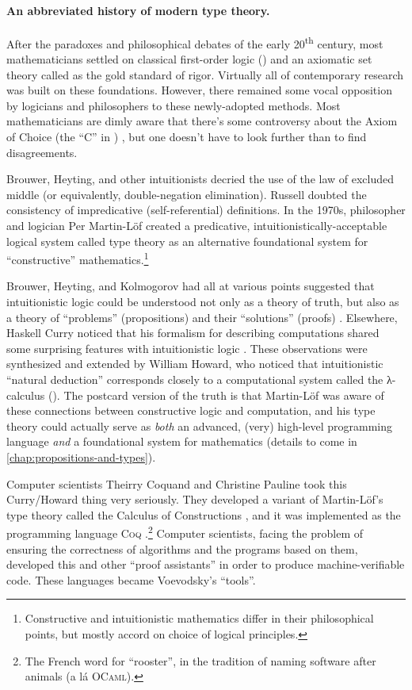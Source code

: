 \documentclass[12pt,twoside]{reedthesis}
\let\oldindex\index
\renewcommand{\index}[1]
               {\oldindex{#1}\marginpar{\footnotesize\color{index}index: #1}}
\newcommand{\indeX}{\oldindex}
\newcommand{\indeX}{\index}
\newcommand{\software}[1]{{\textsc{#1}}\indeX{#1}}
\newcommand{\Coq}{\software{Coq}}
\begin{document}
\paragraph{An abbreviated history of modern type theory.} After the paradoxes
and philosophical debates of the early 20\textsuperscript{th} century, most
mathematicians settled on classical first-order logic (\FOL{}) and an axiomatic
set theory called \ZFC{} as the gold standard of rigor. Virtually all of
contemporary research was built on these foundations. However, there remained
some vocal opposition by logicians and philosophers to these newly-adopted
methods. Most mathematicians are dimly aware that there's some controversy about
the Axiom of Choice (the ``C'' in \ZFC{}) \cite{martin-lof-100-years}, but one
doesn't have to look further than \FOL{} to find disagreements.

Brouwer, Heyting, and other intuitionists decried the use of the law
of excluded middle (or equivalently, double-negation elimination). Russell
doubted the consistency of impredicative (self-referential) definitions.
In the 1970s, philosopher and logician Per Martin-Löf created a predicative,
intuitionistically-acceptable logical system called type theory as an
alternative foundational system for ``constructive''
mathematics.\footnote{Constructive and intuitionistic mathematics differ in
their philosophical points, but mostly accord on choice of logical principles.}

Brouwer, Heyting, and Kolmogorov had all at various points suggested that
intuitionistic logic could be understood not only as a theory of truth, but also
as a theory of ``problems'' (propositions) and their ``solutions'' (proofs)
\cite{kolmogorov}. Elsewhere, Haskell Curry noticed that his formalism for
describing computations shared some surprising features with intuitionistic
logic \cite{curry-howard}. These observations were synthesized and extended by
William Howard, who noticed that intuitionistic ``natural deduction''
corresponds closely to a computational system called the λ-calculus (\LC{}).
The postcard version of the truth is that Martin-Löf was aware of these
connections between constructive logic and computation, and his type theory
could actually serve as \textit{both} an advanced, (very) high-level programming
language \textit{and} a foundational system for mathematics (details to come in
\cref{chap:propositions-and-types}).

Computer scientists Theirry Coquand and Christine Pauline took this Curry/Howard
thing very seriously. They developed a variant of Martin-Löf's type theory called
the Calculus of Constructions \cite{coquand}, and it was implemented as the
programming language \Coq{} \cite{coq-manual}.\footnote{The French word for
``rooster'', in the tradition of naming software after animals (a lá
\software{OCaml}).} Computer scientists, facing the problem of ensuring the
correctness of algorithms and the programs based on them, developed this and
other ``proof assistants'' in order to produce machine-verifiable code. These
languages became Voevodsky's ``tools''.
\end{document}
